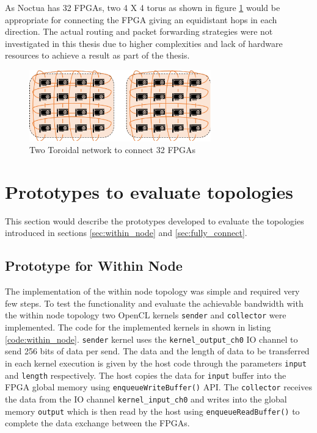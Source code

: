 As Noctua has 32 FPGAs, two 4 X 4 torus as shown in figure \ref{fig:toroidal}
would be appropriate for connecting the FPGA giving an equidistant
hops in each direction. The actual routing and packet forwarding strategies
were not investigated in this thesis due to higher complexities
and lack of hardware resources to achieve a result as part of the thesis.

\begin{figure}[h]%
    \centering
    \includegraphics[width=0.7\textwidth]{images/torus}
    \caption{Two Toroidal network to connect 32 FPGAs}
    \label{fig:toroidal}
\end{figure}

\section{Prototypes to evaluate topologies}

This section would describe the prototypes developed to evaluate the topologies
introduced in sections \ref{sec:within_node} and \ref{sec:fully_connect}.

\subsection{Prototype for Within Node}

The implementation of the within node topology was simple and required very few
steps. To test the functionality and evaluate the achievable bandwidth with the
within node topology two OpenCL kernels \texttt{sender} and \texttt{collector}
were implemented. The code for the implemented kernels in shown in listing
\ref{code:within_node}. \texttt{sender} kernel uses the
\texttt{kernel\_output\_ch0} IO channel to send 256 bits of data per send.
The data and the length of data to be transferred in each kernel execution
is given by the host code through the parameters \texttt{input} and
\texttt{length} respectively. The host copies the data for \texttt{input}
buffer into the FPGA global memory using \texttt{enqueueWriteBuffer()} API.
The \texttt{collector} receives the data from the IO channel \texttt{kernel\_input\_ch0}
and writes into the global memory \texttt{output} which
is then read by the host using \texttt{enqueueReadBuffer()} to complete
the data exchange between the FPGAs.

